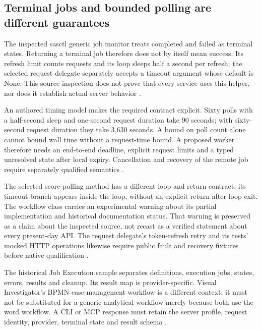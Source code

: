 \subsection{Terminal jobs and bounded polling are different guarantees}
The inspected sasctl generic job monitor treats completed and failed as
terminal states. Returning a terminal job therefore does not by itself
mean success. Its refresh limit counts requests and its loop sleeps half
a second per refresh; the selected request delegate separately accepts a
timeout argument whose default is None. This source inspection does not
prove that every service uses this helper, nor does it establish actual
server behavior \citep{exec23_workflow_delegates_sasctl}.

An authored timing model makes the required contract explicit. Sixty
polls with a half-second sleep and one-second request duration take
90 seconds; with sixty-second request duration they take 3,630 seconds.
A bound on poll count alone cannot bound wall time without a request-time
bound. A proposed worker therefore needs an end-to-end deadline, explicit
request limits and a typed unresolved state after local expiry. Cancellation
and recovery of the remote job require separately qualified semantics
\citep{exec24_sas_choice}.

The selected score-polling method has a different loop and return contract;
its timeout branch appears inside the loop, without an explicit return
after loop exit. The workflow class carries an experimental warning about
its partial implementation and historical documentation status. That
warning is preserved as a claim about the inspected source, not recast as
a verified statement about every present-day API. The request delegate's
token-refresh retry and its tests' mocked HTTP operations likewise require
public fault and recovery fixtures before native qualification
\citep{exec23_workflow_sasctl,exec23_workflow_delegates_sasctl}.

The historical Job Execution sample separates definitions, execution jobs,
states, errors, results and cleanup. Its result map is provider-specific.
Visual Investigator's BPMN case-management workflow is a different context;
it must not be substituted for a generic analytical workflow merely because
both use the word workflow. A CLI or MCP response must retain the server
profile, request identity, provider, terminal state and result schema
\citep{exec24_workflow_contracts_sas}.

